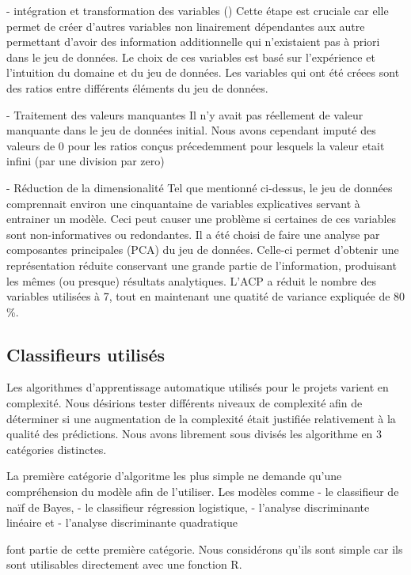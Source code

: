 - intégration et transformation des variables () 
Cette étape est cruciale car elle permet de créer d'autres variables non linairement dépendantes aux autre permettant d'avoir des information additionnelle qui n'existaient pas à priori dans le jeu de données. Le choix de ces variables est basé sur l'expérience et l'intuition du domaine et du jeu de données.
Les variables qui ont été créees sont des ratios entre différents éléments du jeu de données.

- Traitement des valeurs manquantes
Il n'y avait pas réellement de valeur manquante dans le jeu de données initial. Nous avons cependant imputé des valeurs de 0 pour les ratios conçus précedemment pour lesquels la valeur etait infini (par une division par zero)

- Réduction de la dimensionalité
Tel que mentionné ci-dessus, le jeu de données comprennait environ une cinquantaine de variables explicatives servant à entrainer un modèle. Ceci peut causer une problème si certaines de ces variables sont non-informatives ou redondantes. Il a été choisi de faire une analyse par composantes principales (PCA) du jeu de données. Celle-ci permet d'obtenir une représentation réduite conservant une grande partie de l'information, produisant les mêmes (ou presque) résultats analytiques. L'ACP a réduit le nombre des variables utilisées à 7, tout en maintenant une quatité de variance expliquée de 80 \%. 

\subsection{Classifieurs utilisés}

Les algorithmes d'apprentissage automatique utilisés pour le projets varient en complexité. Nous désirions tester différents niveaux de complexité afin de déterminer si une augmentation de la complexité était justifiée relativement à la qualité des prédictions. Nous avons librement sous divisés les algorithme en 3 catégories distinctes. 

La première catégorie d'algoritme les plus simple ne demande qu'une compréhension du modèle afin de l'utiliser. Les modèles comme 
- le classifieur de naïf de Bayes, 
- le classifieur régression logistique, 
- l'analyse discriminante linéaire et 
- l'analyse discriminante quadratique 

font partie de cette première catégorie. Nous considérons qu'ils sont simple car ils sont utilisables directement avec une fonction R. 

